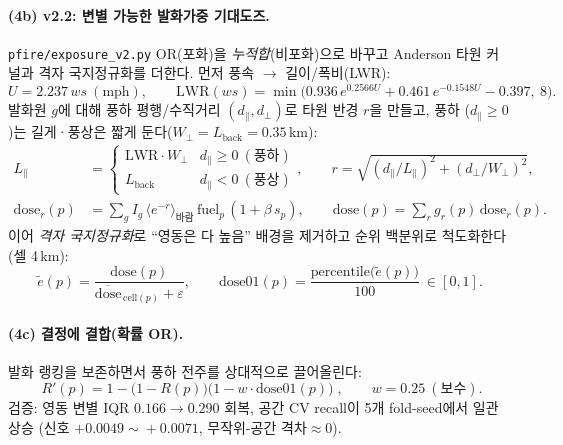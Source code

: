 \documentclass[11pt,a4paper]{article}
\newcommand{\src}[1]{{\footnotesize\color{gray}\texttt{#1}}}
\begin{document}
\paragraph{(4b) v2.2: 변별 가능한 발화가중 기대도즈.} \src{pfire/exposure\_v2.py}
OR(포화)을 \emph{누적합}(비포화)으로 바꾸고 Anderson 타원 커널과 격자 국지정규화를 더한다.
먼저 풍속 $\to$ 길이/폭비(LWR):
\begin{equation}
U=2.237\,ws\ (\text{mph}),\qquad
\mathrm{LWR}(ws)=\min\!\big(0.936\,e^{0.2566U}+0.461\,e^{-0.1548U}-0.397,\ 8\big).
\label{eq:lwr}
\end{equation}
발화원 $g$에 대해 풍하 평행/수직거리 $(d_\parallel,d_\perp)$로 타원 반경 $r$을 만들고, 풍하
($d_\parallel\!\ge\!0$)는 길게·풍상은 짧게 둔다($W_\perp{=}L_{\text{back}}{=}0.35$\,km):
\begin{align}
L_\parallel &= \begin{cases}\mathrm{LWR}\cdot W_\perp & d_\parallel\ge 0\ (\text{풍하})\\ L_{\text{back}} & d_\parallel<0\ (\text{풍상})\end{cases},\qquad
r=\sqrt{(d_\parallel/L_\parallel)^2+(d_\perp/W_\perp)^2},\\[2pt]
\mathrm{dose}_r(p)&=\sum_{g} I_g\,\big\langle e^{-r}\big\rangle_{\text{바람}}\,\mathrm{fuel}_p\,(1+\beta\,s_p),
\qquad
\mathrm{dose}(p)=\sum_{r} g_r(p)\,\mathrm{dose}_r(p).
\label{eq:dose}
\end{align}
이어 \emph{격자 국지정규화}로 ``영동은 다 높음'' 배경을 제거하고 순위 백분위로 척도화한다(셀 4\,km):
\begin{equation}
\widetilde{e}(p)=\frac{\mathrm{dose}(p)}{\overline{\mathrm{dose}}_{\,\mathrm{cell}(p)}+\varepsilon},
\qquad
\mathrm{dose01}(p)=\frac{\mathrm{percentile}\big(\widetilde{e}(p)\big)}{100}\ \in[0,1].
\label{eq:dose01}
\end{equation}

\paragraph{(4c) 결정에 결합(확률 OR).}
발화 랭킹을 보존하면서 풍하 전주를 상대적으로 끌어올린다:
\begin{equation}
\boxed{\;R'(p)=1-\big(1-R(p)\big)\big(1-w\cdot\mathrm{dose01}(p)\big)\;},\qquad w=0.25\ (\text{보수}).
\label{eq:blend}
\end{equation}
검증: 영동 변별 IQR $0.166\!\to\!0.290$ 회복, 공간 CV recall이 5개 fold-seed에서 일관 상승
(신호 $+0.0049\!\sim\!+0.0071$, 무작위-공간 격차$\approx 0$).
\end{document}
